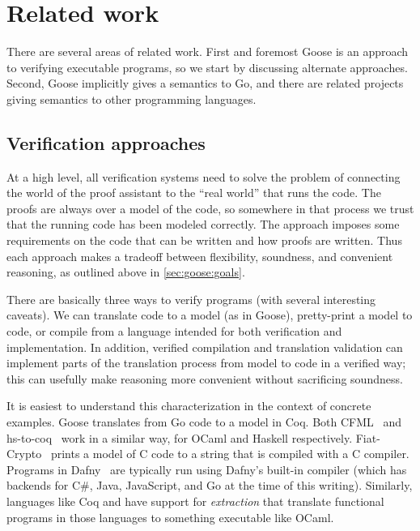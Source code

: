 \section{Related work}%
\label{s:goose:rel-work}

There are several areas of related work. First and foremost Goose is an approach
to verifying executable programs, so we start by discussing alternate
approaches. Second, Goose implicitly gives a semantics to Go, and there are
related projects giving semantics to other programming languages.

\subsection{Verification approaches}

At a high level, all verification systems need to solve the problem of
connecting the world of the proof assistant to the ``real world'' that runs the
code. The proofs are always over a model of the code, so somewhere in that
process we trust that the running code has been modeled correctly. The approach
imposes some requirements on the code that can be written and how proofs are
written. Thus each approach makes a tradeoff between flexibility, soundness, and
convenient reasoning, as outlined above in \autoref{sec:goose:goals}.

There are basically three ways to verify programs (with several interesting
caveats). We can translate code to a model (as in Goose), pretty-print a
model to code, or compile from a language intended for both verification and
implementation. In addition, verified compilation and translation validation can
implement parts of the translation process from model to code in a verified way;
this can usefully make reasoning more convenient without sacrificing soundness.

It is easiest to understand this characterization in the context of concrete
examples. Goose translates from Go code to a model in Coq. Both
CFML~\cite{chargueraud:cfml} and hs-to-coq~\cite{spector-zabusky:hstocoq} work
in a similar way, for OCaml and Haskell respectively.
Fiat-Crypto~\cite{erbsen:fiat-crypto} prints a model of C code to a string that
is compiled with a C compiler. Programs in Dafny~\cite{leino:dafny} are
typically run using Dafny's built-in compiler (which has backends for C\#, Java,
JavaScript, and Go at the time of this writing). Similarly, languages like Coq
and \fstar have support for \emph{extraction} that translate functional programs
in those languages to something executable like OCaml.

